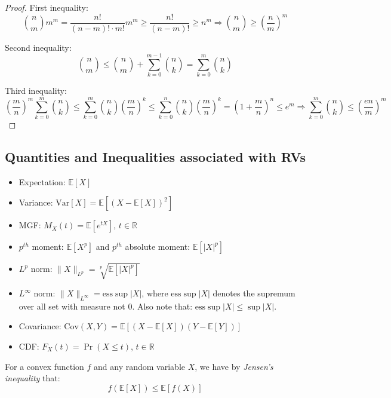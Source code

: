 \documentclass{article}
\theoremstyle{remark}
\newcommand{\real}{\mathbb{R}}
\newcommand{\Exp}{\mathbb{E}}
\newcommand{\Var}{\mathrm{Var}}
\newcommand{\Cov}{\mathrm{Cov}}
\begin{document}
\begin{proof}
First inequality:
\begin{equation*}
\binom{n}{m} m^{m} = \frac{n!}{(n - m)! \cdot m!} m^{m} \geq \frac{n!}{(n - m)!} \geq n^{m} \Rightarrow \binom{n}{m} \geq \left(\frac{n}{m}\right)^{m}
\end{equation*}

Second inequality:
\begin{equation*}
\binom{n}{m} \leq \binom{n}{m} + \sum_{k=0}^{m-1} \binom{n}{k} = \sum_{k=0}^{m}\binom{n}{k}
\end{equation*}

Third inequality:
\begin{equation*}
\left(\frac{m}{n}\right)^{m} \sum_{k=0}^{m}\binom{n}{k} \leq \sum_{k=0}^{m} \binom{n}{k} \left(\frac{m}{n}\right)^{k} \leq \sum_{k=0}^{n} \binom{n}{k} \left(\frac{m}{n}\right)^{k} = \left(1 + \frac{m}{n}\right)^{n} \leq e^{m} \Rightarrow \sum_{k=0}^{m}\binom{n}{k} \leq \left(\frac{en}{m}\right)^{m}
\end{equation*}
\end{proof}

\subsection{Quantities and Inequalities associated with RVs}

\begin{itemize}
\item Expectation: \(\Exp[X]\)
\item Variance: \(\Var[X] = \Exp[(X - \Exp[X])^{2}]\)
\item MGF: \(M_{X}(t) = \Exp[e^{tX}]\), \(t \in \real\)
\item \(p^{th}\) moment: \(\Exp[X^{p}]\) and \(p^{th}\) absolute moment: \(\Exp[|X|^{p}]\)
\item \(L^{p}\) norm: \(\|X\|_{L^{p}} = \sqrt[p]{\Exp[|X|^{p}]}\)
\item \(L^{\infty}\) norm: \(\|X\|_{L^{\infty}} = \mathrm{ess} \sup |X|\), where \(\mathrm{ess} \sup |X|\) denotes the supremum over all set with measure not 0. Also note that: \(\mathrm{ess} \sup |X| \leq \sup |X|\).
\item Covariance: \(\Cov(X, Y) = \Exp[(X - \Exp[X])(Y - \Exp[Y])]\)
\item CDF: \(F_{X}(t) = \Pr(X \leq t)\), \(t \in \real\)
\end{itemize}

For a convex function \(f\) and any random variable \(X\), we have by \emph{Jensen's inequality} that:
\begin{equation*}
f(\Exp[X]) \leq \Exp[f(X)]
\end{equation*}
\end{document}
